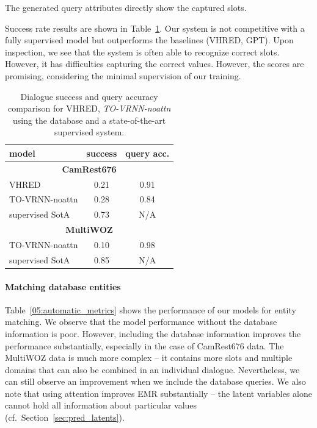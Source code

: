 The generated query attributes directly show the captured slots.


Success rate results are shown in Table~\ref{tab:success}.
Our system is not competitive with a fully supervised model but outperforms the baselines (VHRED, GPT).
Upon inspection,
we see that the system is often able to recognize correct slots.
However, it has difficulties capturing the correct values.
However, the scores are promising, considering the minimal supervision of our training.

\begin{table}[tp]
    \centering\small
    \begin{tabular}{lcc}
      \toprule
      model &  success & query acc.\hspace{-2mm} \\
      \midrule
      \multicolumn{3}{c}{\textbf{CamRest676}} \\
      \midrule
      VHRED & 0.21 & 0.91 \\
      TO-VRNN-noattn & 0.28 & 0.84 \\\hdashline[0.5pt/2pt]
      supervised SotA \cite{peng2021soloist}\hspace{-2mm} & 0.73 & N/A \\
      \midrule
      \multicolumn{3}{c}{\textbf{MultiWOZ}} \\
      \midrule
      TO-VRNN-noattn & 0.10 & 0.98 \\\hdashline[0.5pt/2pt]
      supervised SotA \cite{peng2021soloist}\hspace{-2mm} & 0.85 & N/A \\
      \bottomrule
  \end{tabular}
  \caption{Dialogue success and query accuracy comparison for VHRED, \emph{TO-VRNN-noattn} using the database and a state-of-the-art supervised system.}
  \label{tab:success}
\end{table}

\paragraph{Matching database entities}
\label{sec:emr}
Table~\ref{05:automatic_metrics} shows the performance of our models for entity matching.
We observe that the model performance without the database information is poor.
However, including the database information improves the performance substantially, especially in the case of CamRest676 data.
The MultiWOZ data is much more complex -- it contains more slots and multiple domains that can also be combined in an individual dialogue.
Nevertheless, we can still observe an improvement when we include the database queries.
We also note that using attention improves EMR substantially -- the latent variables alone cannot hold all information about particular values (cf.~Section~\ref{sec:pred_latents}).

